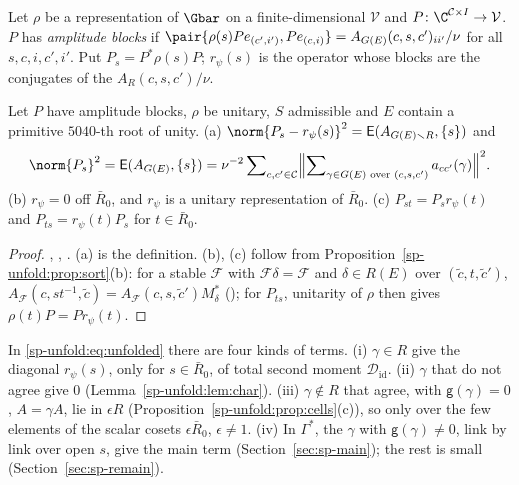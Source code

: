 \begin{definition}
\label{sp-unfold:def:blocks}
Let $\rho$ be a representation of $\Gbar$ on a finite-dimensional $\mathcal V$ and
$P\colon\C^{\mathcal C\times I}\to\mathcal V$. $P$ has \emph{amplitude blocks} if
$\pair{\rho(s)Pe_{(c',i')},Pe_{(c,i)}}=A_{G(E)}(c,s,c')_{ii'}/\nu$ for all $s,c,i,c',i'$. Put $P_s=P^*\rho(s)P$;
$r_\psi(s)$ is the operator whose blocks are the conjugates of the $A_R(c,s,c')/\nu$.
\end{definition}

\begin{lemma}\label{sp-unfold:lem:rpsi}
Let $P$ have amplitude blocks, $\rho$ be unitary, $S$ admissible and $E$ contain a primitive
$5040$-th root of unity. (a) $\norm{P_s-r_\psi(s)}^2=\mathsf E(A_{G(E)\smallsetminus R},\{s\})$ and
\begin{equation}\label{sp-unfold:eq:unfolded}
\norm{P_s}^2=\mathsf E(A_{G(E)},\{s\})=\nu^{-2}\sum\nolimits_{c,c'\in\mathcal C}\Bigl\Vert
\sum\nolimits_{\gamma\in G(E)\text{ over }(c,s,c')}a_{cc'}(\gamma)\Bigr\Vert^2.
\end{equation}
(b) $r_\psi=0$ off $\bar R_0$, and $r_\psi$ is a unitary representation of $\bar R_0$. (c)
$P_{st}=P_sr_\psi(t)$ and $P_{ts}=r_\psi(t)P_s$ for $t\in\bar R_0$.
\end{lemma}

\begin{proof}
,
, .
(a) is the definition. (b), (c) follow from Proposition~\ref{sp-unfold:prop:sort}(b): for a stable
$\mathcal F$ with $\mathcal F\delta=\mathcal F$ and $\delta\in R(E)$ over $(\tilde c,t,\tilde c')$, $A_{\mathcal F}(c,st^{-1},\tilde c)=A_{\mathcal F}(c,s,\tilde c')M_\delta^*$
(); for $P_{ts}$, unitarity of $\rho$ then gives
$\rho(t)P=Pr_\psi(t)$.
\end{proof}

\begin{remark}\label{sp-unfold:rem:terms}
In \eqref{sp-unfold:eq:unfolded} there are four kinds of terms. (i) $\gamma\in R$ give the diagonal
$r_\psi(s)$, only for $s\in\bar R_0$, of total second moment $\mathcal D_{\mathrm{id}}$. (ii)
$\gamma$ that do not agree give $0$ (Lemma~\ref{sp-unfold:lem:char}). (iii) $\gamma\notin R$ that
agree, with $\mathsf g(\gamma)=0$, $A=\gamma A$, lie in $\epsilon R$
(Proposition~\ref{sp-unfold:prop:cells}(c)), so only over the few elements of the scalar cosets
$\epsilon\bar R_0$, $\epsilon\ne1$. (iv) In $\Gamma^*$, the $\gamma$ with $\mathsf g(\gamma)\ne0$, link by
link over open $s$, give the main term (Section~\ref{sec:sp-main}); the rest is small
(Section~\ref{sec:sp-remain}).
\end{remark}

